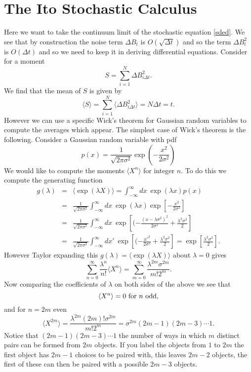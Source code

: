 \documentclass[11pt]{report}
\begin{document}
\section{The Ito Stochastic Calculus}
Here we want to take the continuum limit of the stochastic equation \eqref{sded}. We see that
by construction the noise term $\Delta B_t$ is $O(\sqrt{\Delta t})$ and so the term $\Delta B_t^2$ is $O(\Delta t)$ and so we need to keep it in deriving differential equations. Consider for a moment 
\begin{equation}
S = \sum_{i=1}^N \Delta B_{i\Delta t}^2.
\end{equation}
We find that the mean of $S$ is given by
\begin{equation}
\langle S\rangle = \sum_{i=1}^N  \langle\Delta B_{i\Delta t}^2 \rangle= N\Delta t = t.
\end{equation}
However we can use a specific Wick's theorem for Gaussian random variables to compute 
the averages which appear. 
The simplest case of Wick's theorem is the following. Consider a Gaussian random variable with pdf 
\begin{equation}
p(x) = \frac{1}{\sqrt{2\pi \sigma^2}}\exp(-\frac{x^2}{2\sigma^2})
\end{equation}
We would like to compute the moments $\langle X^n\rangle$ for integer $n$. To do this we compute the generating function
\begin{eqnarray}
g(\lambda) &=& \langle \exp(\lambda X)\rangle = \int_{-\infty}^{\infty} dx\
 \exp(\lambda x)
p(x) \nonumber \\
&=& \frac{1}{\sqrt{2\pi \sigma^2}}\int_{-\infty}^{\infty} dx\
 \exp(\lambda x)\exp\left[-\frac{x^2}{2\sigma^2}\right] \nonumber\\
 &=& \frac{1}{\sqrt{2\pi \sigma^2}}\int_{-\infty}^{\infty} dx\ 
 \exp\left[(-\frac{(x-\lambda\sigma^2)^2}{2\sigma^2}+\frac{\lambda^2\sigma^2}{2}\right] \nonumber\\
 &=& \frac{1}{\sqrt{2\pi \sigma^2}}\int_{-\infty}^{\infty} dx'\ 
 \exp\left[(-\frac{x'^2}{2\sigma^2}+\frac{\lambda^2\sigma^2}{2}\right] = \exp\left[\frac{\lambda^2\sigma^2}{2}\right].
\end{eqnarray}
However Taylor expanding this $ g(\lambda) = \langle \exp(\lambda X)\rangle$ about $\lambda=0$  gives 
\begin{equation}
\sum_{n=0}^\infty \frac{\lambda^n}{n!} \langle X^n\rangle = \sum_{m=0}^\infty \frac{\lambda^{2m}\sigma^{2m}}{m! 2^m}.
\end{equation}
Now comparing the coefficients of $\lambda$ on both sides of the above we see that
\begin{equation}
\langle X^n\rangle = 0 \ {\rm for}\ n\ {\rm odd},
\end{equation}
and for $n=2m$ even
\begin{equation}
\langle X^{2m}\rangle = \frac{\lambda^{2m} (2m)! \sigma^{2m}}{m! 2^m} = \sigma^{2m} (2m-1)(2m-3)\cdots 1.
\end{equation}
Notice that $(2m-1)(2m-3)\cdots 1$ the number of ways in which $m$ distinct pairs can be formed from $2m$ objects. If you label the objects from $1$ to $2m$ the first object has $2m-1$ choices to be paired with, this leaves $2m-2$ objects, the first of these can then be paired with a possible $2m-3$ objects. 
\end{document}
